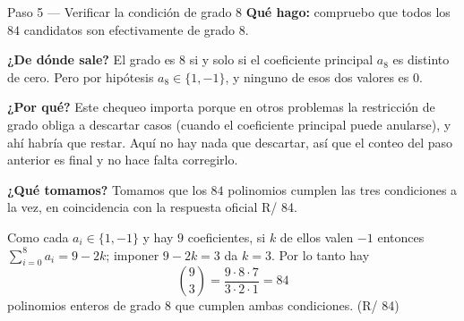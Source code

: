 \documentclass[11pt]{article}
\begin{document}
\begin{paso}{Paso 5 --- Verificar la condición de grado 8}
\textbf{Qué hago:} compruebo que todos los $84$ candidatos son efectivamente de grado $8$.

\textbf{¿De dónde sale?} El grado es $8$ si y solo si el coeficiente principal $a_8$ es distinto de
cero. Pero por hipótesis $a_8\in\{1,-1\}$, y ninguno de esos dos valores es $0$.

\textbf{¿Por qué?} Este chequeo importa porque en otros problemas la restricción de grado obliga a
descartar casos (cuando el coeficiente principal puede anularse), y ahí habría que restar. Aquí no
hay nada que descartar, así que el conteo del paso anterior es final y no hace falta corregirlo.

\textbf{¿Qué tomamos?} Tomamos que los $84$ polinomios cumplen las tres condiciones a la vez, en
coincidencia con la respuesta oficial R/ 84.
\end{paso}

\begin{resp}
Como cada $a_i\in\{1,-1\}$ y hay $9$ coeficientes, si $k$ de ellos valen $-1$ entonces
$\sum_{i=0}^{8}a_i=9-2k$; imponer $9-2k=3$ da $k=3$. Por lo tanto hay
\[
\binom{9}{3}=\frac{9\cdot 8\cdot 7}{3\cdot 2\cdot 1}=84
\]
polinomios enteros de grado $8$ que cumplen ambas condiciones. \hfill (R/ 84)
\end{resp}
\end{document}
